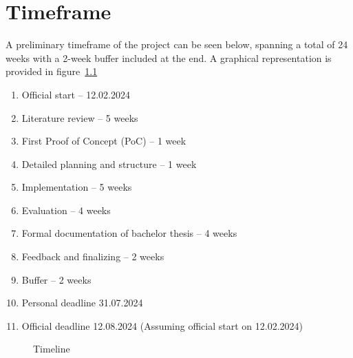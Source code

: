 \chapter{Timeframe}
A preliminary timeframe of the project can be seen below, spanning a total of 24 weeks with a 2-week buffer included at the end.
A graphical representation is provided in figure~\ref{fig:timeline}

\begin{enumerate}
    \item Official start -- 12.02.2024
    \item Literature review -- 5 weeks
    \item First Proof of Concept (PoC) -- 1 week
    \item Detailed planning and structure -- 1 week
    \item Implementation -- 5 weeks
    \item Evaluation -- 4 weeks
    \item Formal documentation of bachelor thesis -- 4 weeks
    \item Feedback and finalizing -- 2 weeks
    \item Buffer -- 2 weeks
    \item Personal deadline 31.07.2024
    \item Official deadline 12.08.2024 (Assuming official start on 12.02.2024)
\end{enumerate}

\begin{figure}[t]
    \centering
    \caption{Timeline}\label{fig:timeline}
\end{figure}%
